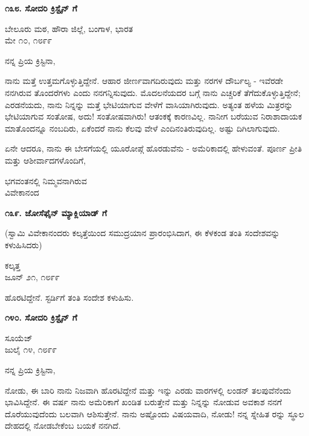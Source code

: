 \begin{center}
\textbf{೧೩೮. ಸೋದರಿ ಕ್ರಿಸ್ಟೈನ್ ಗೆ}
\end{center}

\begin{flushright}
ಬೇಲೂರು ಮಠ, ಹೌರಾ ಜಿಲ್ಲೆ, ಬಂಗಾಳ, ಭಾರತ\\ಮೇ ೧೦, ೧೮೯೯
\end{flushright}

ನನ್ನ ಪ್ರಿಯ ಕ್ರಿಸ್ಟಿನಾ,

ನಾನು ಮತ್ತೆ ಉತ್ತಮಗೊಳ್ಳುತ್ತಿದ್ದೇನೆ. ಆಹಾರ ಜೀರ್ಣವಾಗದಿರುವುದು ಮತ್ತು ನರಗಳ ದೌರ್ಬಲ್ಯ - ಇವೆರಡೇ ನನಗಿರುವ ತೊಂದರೆಗಳು ಎಂದು ನನಗನ್ನಿಸುವುದು. ಮೊದಲನೆಯದರ ಬಗ್ಗೆ ನಾನು ಎಚ್ಚರಿಕೆ ತೆಗೆದುಕೊಳ್ಳುತ್ತಿದ್ದೇನೆ; ಎರಡನೆಯದು, ನಾನು ನಿನ್ನನ್ನು ಮತ್ತೆ ಭೇಟಿಯಾಗುವ ವೇಳೆಗೆ ವಾಸಿಯಾಗಿರುವುದು. ಅತ್ಯಂತ ಹಳೆಯ ಮಿತ್ರರನ್ನು ಭೇಟಿಯಾಗುವ ಸಂತೋಷ, ಅದು! ಸಂತೋಷವಾಗಿರು! ಆತಂಕಕ್ಕೆ ಕಾರಣವಿಲ್ಲ. ನಾನೀಗ ಬರೆಯುವ ನಿರಾಶಾದಾಯಕ ಮಾತೊಂದನ್ನೂ ನಂಬದಿರು, ಏಕೆಂದರೆ ನಾನು ಕೆಲವು ವೇಳೆ ಎಂದಿನಂತಿರುವುದಿಲ್ಲ. ಅಷ್ಟು ದಿಗಿಲಾಗುವುದು.

ಏನೇ ಆದರೂ, ನಾನು ಈ ಬೇಸಗೆಯಲ್ಲಿ ಯೂರೋಪ್ಗೆ ಹೊರಡುವೆನು - ಅಮೆರಿಕಾದಲ್ಲಿ ಹೇಳುವಂತೆ. ಪೂರ್ಣ ಪ್ರೀತಿ ಮತ್ತು ಆಶೀರ್ವಾದಗಳೊಂದಿಗೆ,

\begin{flushright}
ಭಗವಂತನಲ್ಲಿ ನಿಮ್ಮವನಾಗಿರುವ\\ವಿವೇಕಾನಂದ
\end{flushright}

\begin{center}
\textbf{೧೩೯. ಜೋಸೆಫೈನ್ ಮ್ಯಾಕ್ಲಿಯಾಡ್ ಗೆ}
\end{center}

\begin{center}
(ಸ್ವಾಮಿ ವಿವೇಕಾನಂದರು ಕಲ್ಕತ್ತೆಯಿಂದ ಸಮುದ್ರಯಾನ ಪ್ರಾರಂಭಿಸಿದಾಗ, ಈ ಕೆಳಕಂಡ ತಂತಿ ಸಂದೇಶವನ್ನು ಕಳುಹಿಸಿದರು)
\end{center}

\begin{flushright}
ಕಲ್ಕತ್ತ\\ಜೂನ್ ೨೧, ೧೮೯೯
\end{flushright}

ಹೊರಟಿದ್ದೇನೆ. ಸ್ಟರ್ಡಿಗೆ ತಂತಿ ಸಂದೇಶ ಕಳುಹಿಸು.

\begin{center}
\textbf{೧೪೦. ಸೋದರಿ ಕ್ರಿಸ್ಟೈನ್ ಗೆ}
\end{center}

\begin{flushright}
ಸೂಯೆಜ್\\ಜುಲೈ ೧೪, ೧೮೯೯
\end{flushright}

ನನ್ನ ಪ್ರಿಯ ಕ್ರಿಸ್ಟಿನಾ,

ನೋಡು, ಈ ಬಾರಿ ನಾನು ನಿಜವಾಗಿ ಹೊರಟಿದ್ದೇನೆ ಮತ್ತು ಇನ್ನು ಎರಡು ವಾರಗಳಲ್ಲಿ ಲಂಡನ್ ತಲಪುವೆನೆಂದು ಭಾವಿಸಿದ್ದೇನೆ. ಈ ವರ್ಷ ನಾನು ಅಮೆರಿಕಾಗೆ ಖಂಡಿತ ಬರುತ್ತೇನೆ ಮತ್ತು ನಿನ್ನನ್ನು ನೋಡುವ ಅವಕಾಶ ನನಗೆ ದೊರೆಯುವುದೆಂದು ಬಲವಾಗಿ ಆಶಿಸುತ್ತೇನೆ. ನಾನು ಅಷ್ಟೊಂದು ವಿಷಯವಾದಿ, ನೋಡು! ನನ್ನ ಸ್ನೇಹಿತ ರನ್ನು ಸ್ಥೂಲ ದೇಹದಲ್ಲಿ ನೋಡಬೇಕೆಂಬ ಬಯಕೆ ನನಗಿದೆ.

